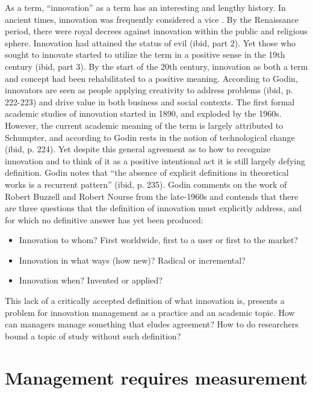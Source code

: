 \documentclass[man]{apa7}
\begin{document}
As a term, ``innovation'' as a term has an interesting and lengthy history. In  ancient times, innovation was frequently considered a vice \parencite[part 1]{godinInnovationContestedIdea2015}. By the Renaissance period, there were royal decrees against innovation within the public and religious sphere. Innovation had attained the status of evil (ibid, part 2). Yet those who sought to innovate started to utilize the term in a positive sense in the 19th century (ibid, part 3). By the start of the 20th century, innovation as both a term and concept had been rehabilitated to a positive meaning. According to Godin, innovators are seen as people applying creativity to address problems (ibid, p. 222-223) and drive value in both business and social contexts. The first formal academic studies of innovation started in 1890, and exploded by the 1960s. However, the current academic meaning of the term is largely attributed to Schumpter, and according to Godin rests in the notion of technological change (ibid, p. 224).  Yet despite this general agreement as to how to recognize innovation and to think of it as a positive intentional act it is still largely defying definition. Godin notes that ``the absence of explicit definitions in theoretical works is a recurrent pattern'' (ibid, p. 235). Godin comments on the work of Robert Buzzell and Robert Nourse from the late-1960s and contends that there are three questions that the definition of innovation must explicitly address, and for which no definitive answer has yet been produced:

\begin{itemize}
\item Innovation  to  whom?  First  worldwide,  first  to  a  user  or  first  to  the  market?
\item Innovation in what ways (how new)? Radical or incremental?
\item Innovation when? Invented or applied?
\end{itemize}

This lack of a critically accepted definition of what innovation is, presents a problem for innovation management as a practice and an academic topic. How can managers manage something that eludes agreement? How to do researchers bound a topic of study without such definition?

\section{Management requires measurement}
\label{sec:org667c63e}
\end{document}
